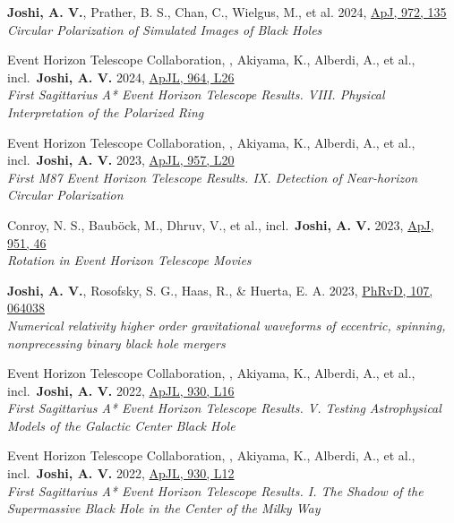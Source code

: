\item \textbf{Joshi, A. V.}, Prather, B. S., Chan, C., Wielgus, M., et al. 2024, \href{https://ui.adsabs.harvard.edu/abs/2024ApJ...972..135J}{ApJ, 972, 135}\\\textit{Circular Polarization of Simulated Images of Black Holes}

\item Event Horizon Telescope Collaboration, , Akiyama, K., Alberdi, A., et al., incl.\ \textbf{Joshi, A. V.} 2024, \href{https://ui.adsabs.harvard.edu/abs/2024ApJ...964L..26E}{ApJL, 964, L26}\\\textit{First Sagittarius A* Event Horizon Telescope Results. VIII. Physical Interpretation of the Polarized Ring}

\item Event Horizon Telescope Collaboration, , Akiyama, K., Alberdi, A., et al., incl.\ \textbf{Joshi, A. V.} 2023, \href{https://ui.adsabs.harvard.edu/abs/2023ApJ...957L..20E}{ApJL, 957, L20}\\\textit{First M87 Event Horizon Telescope Results. IX. Detection of Near-horizon Circular Polarization}

\item Conroy, N. S., Bauböck, M., Dhruv, V., et al., incl.\ \textbf{Joshi, A. V.} 2023, \href{https://ui.adsabs.harvard.edu/abs/2023ApJ...951...46C}{ApJ, 951, 46}\\\textit{Rotation in Event Horizon Telescope Movies}

\item \textbf{Joshi, A. V.}, Rosofsky, S. G., Haas, R., \& Huerta, E. A. 2023, \href{https://ui.adsabs.harvard.edu/abs/2023PhRvD.107f4038J}{PhRvD, 107, 064038}\\\textit{Numerical relativity higher order gravitational waveforms of eccentric, spinning, nonprecessing binary black hole mergers}

\item Event Horizon Telescope Collaboration, , Akiyama, K., Alberdi, A., et al., incl.\ \textbf{Joshi, A. V.} 2022, \href{https://ui.adsabs.harvard.edu/abs/2022ApJ...930L..16E}{ApJL, 930, L16}\\\textit{First Sagittarius A* Event Horizon Telescope Results. V. Testing Astrophysical Models of the Galactic Center Black Hole}

\item Event Horizon Telescope Collaboration, , Akiyama, K., Alberdi, A., et al., incl.\ \textbf{Joshi, A. V.} 2022, \href{https://ui.adsabs.harvard.edu/abs/2022ApJ...930L..12E}{ApJL, 930, L12}\\\textit{First Sagittarius A* Event Horizon Telescope Results. I. The Shadow of the Supermassive Black Hole in the Center of the Milky Way}

